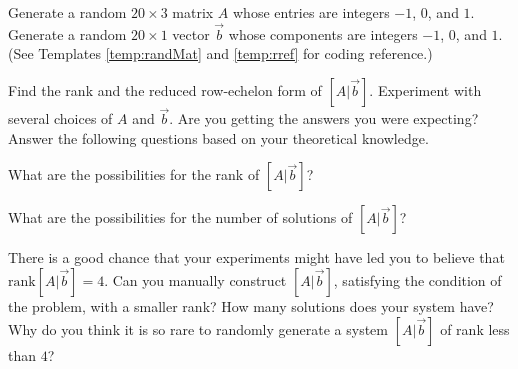 \documentclass{ximera}
\begin{document}
\begin{problem}\label{prob_oct_2}
Generate a random $20\times 3$ matrix $A$ whose entries are integers $-1$, $0$, and $1$.  Generate a random $20\times 1$ vector $\vec{b}$ whose components are integers $-1$, $0$, and $1$.  (See Templates \ref{temp:randMat} and \ref{temp:rref} for coding reference.)

Find the rank and the reduced row-echelon form of $[A | \vec{b}]$.  Experiment with several choices of $A$ and $\vec{b}$.  Are you getting the answers you were expecting?  Answer the following questions based on your theoretical knowledge.

What are the possibilities for the rank of $[A | \vec{b}]$?  

\begin{multipleChoice}
\end{multipleChoice}

What are the possibilities for the number of solutions of $[A | \vec{b}]$?

\begin{multipleChoice}
\end{multipleChoice}

There is a good chance that your experiments might have led you to believe that $\text{rank}[A | \vec{b}]=4$.  Can you manually construct $[A | \vec{b}]$, satisfying the condition of the problem, with a smaller rank?  How many solutions does your system have?  Why do you think it is so rare to randomly generate a system $[A | \vec{b}]$ of rank less than $4$?







    
\end{problem}
\end{document}

